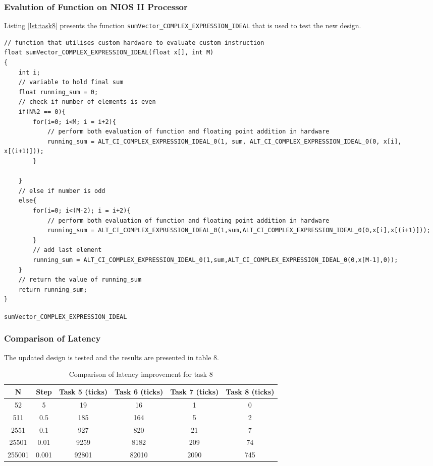 \documentclass{article}
\begin{document}
\subsubsection{Evalution of Function on NIOS II Processor}
Listing \ref{lst:task8} presents the function {\tt sumVector\_COMPLEX\_EXPRESSION\_IDEAL} that is used to test the new design.

\begin{listing}[H]
\begin{verbatim}
// function that utilises custom hardware to evaluate custom instruction
float sumVector_COMPLEX_EXPRESSION_IDEAL(float x[], int M)
{
    int i;
    // variable to hold final sum
    float running_sum = 0;
    // check if number of elements is even
    if(N%2 == 0){
        for(i=0; i<M; i = i+2){
            // perform both evaluation of function and floating point addition in hardware
            running_sum = ALT_CI_COMPLEX_EXPRESSION_IDEAL_0(1, sum, ALT_CI_COMPLEX_EXPRESSION_IDEAL_0(0, x[i], x[(i+1)]));
        }
        
    }
    // else if number is odd
    else{
        for(i=0; i<(M-2); i = i+2){
            // perform both evaluation of function and floating point addition in hardware
            running_sum = ALT_CI_COMPLEX_EXPRESSION_IDEAL_0(1,sum,ALT_CI_COMPLEX_EXPRESSION_IDEAL_0(0,x[i],x[(i+1)]));
        }
        // add last element
        running_sum = ALT_CI_COMPLEX_EXPRESSION_IDEAL_0(1,sum,ALT_CI_COMPLEX_EXPRESSION_IDEAL_0(0,x[M-1],0));
    }
    // return the value of running_sum
    return running_sum;
}
\end{verbatim}
\caption{{\tt sumVector\_COMPLEX\_EXPRESSION\_IDEAL}} 
\label{lst:task8}
\end{listing}

\subsubsection{Comparison of Latency}
The updated design is tested and the results are presented in table 8.

\begin{table}[H]
  \centering
    \begin{tabular}{|c|c|c|c|c|c|}
    \hline
    \textbf{N} & \textbf{Step} & \textbf{Task 5 (ticks)} & \textbf{Task 6 (ticks)} & \textbf{Task 7 (ticks)}  & \textbf{Task 8 (ticks)} \\
    \hline
    52    & 5     & 19    & 16    & 1 & 0\\
    \hline
    511   & 0.5   & 185   & 164   & 5 & 2 \\
    \hline
    2551  & 0.1   & 927   & 820   & 21 & 7  \\
    \hline
    25501 & 0.01  & 9259  & 8182  & 209 & 74  \\
    \hline
    255001 & 0.001 & 92801 & 82010 & 2090 & 745 \\
    \hline
    \end{tabular}%
  \caption{Comparison of latency improvement for task 8}
  \label{tab:task7_latency_1}%
\end{table}%
\end{document}
